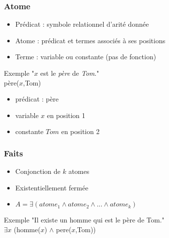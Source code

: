 
\begin{frame}
	\frametitle{Atome}
	\begin{center}
	\begin{itemize}
		\item Prédicat : symbole relationnel d'arité donnée
		\item Atome : prédicat et termes associés à ses positions
		\item Terme : variable ou constante (pas de fonction)
	\end{itemize}
	\vspace{10mm}
	\begin{exampleblock}{Exemple}
	"$x$ est le {\em père} de {\em Tom}."\\
	père($x$,Tom)
	\begin{itemize}
		\item prédicat : père
		\item variable $x$ en position 1
		\item constante $Tom$ en position 2
	\end{itemize}
	\end{exampleblock}
	\end{center}
\end{frame}

\begin{frame}
	\frametitle{Faits}
	\begin{center}
	\vspace{10mm}
	\begin{itemize}
		\item Conjonction de $k$ atomes
		\item Existentiellement fermée
		\item $A = \exists (atome_1 \wedge atome_2 \wedge ... \wedge atome_k)$
	\end{itemize}
	\vfill
	\begin{exampleblock}{Exemple}
		"Il existe un homme qui est le père de Tom."\\
		$\exists x$ (homme($x$) $\wedge$ pere($x$,Tom))
	\end{exampleblock}
	\end{center}
	\vspace{10mm}
\end{frame}

